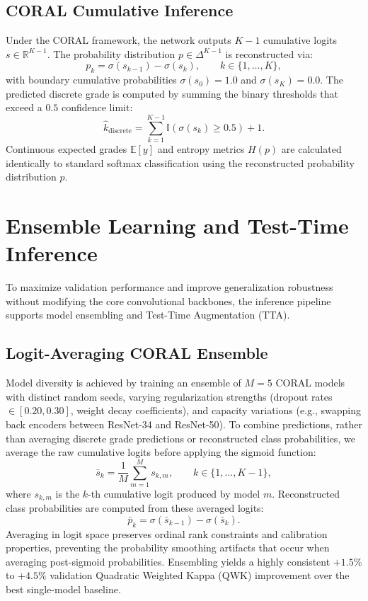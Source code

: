 \documentclass[12pt]{article}
\begin{document}
\subsection{CORAL Cumulative Inference}
Under the CORAL framework, the network outputs $K-1$ cumulative logits $s \in \mathbb{R}^{K-1}$.
The probability distribution $p \in \Delta^{K-1}$ is reconstructed via:
\[
p_k = \sigma(s_{k-1}) - \sigma(s_k), \qquad k \in \{1, \dots, K\},
\]
with boundary cumulative probabilities $\sigma(s_0) = 1.0$ and $\sigma(s_K) = 0.0$.
The predicted discrete grade is computed by summing the binary thresholds that exceed a $0.5$ confidence limit:
\[
\hat{k}_{\text{discrete}} = \sum_{k=1}^{K-1} \mathbb{I}(\sigma(s_k) \ge 0.5) + 1.
\]
Continuous expected grades $\mathbb{E}[y]$ and entropy metrics $H(p)$ are calculated identically to standard softmax classification using the reconstructed probability distribution $p$.

\section{Ensemble Learning and Test-Time Inference}
To maximize validation performance and improve generalization robustness without modifying the core convolutional backbones, the inference pipeline supports model ensembling and Test-Time Augmentation (TTA).

\subsection{Logit-Averaging CORAL Ensemble}
Model diversity is achieved by training an ensemble of $M = 5$ CORAL models with distinct random seeds, varying regularization strengths (dropout rates $\in [0.20, 0.30]$, weight decay coefficients), and capacity variations (e.g., swapping back encoders between ResNet-34 and ResNet-50).
To combine predictions, rather than averaging discrete grade predictions or reconstructed class probabilities, we average the raw cumulative logits before applying the sigmoid function:
\[
\bar{s}_k = \frac{1}{M}\sum_{m=1}^{M} s_{k,m}, \qquad k \in \{1, \dots, K-1\},
\]
where $s_{k,m}$ is the $k$-th cumulative logit produced by model $m$.
Reconstructed class probabilities are computed from these averaged logits:
\[
\bar{p}_k = \sigma(\bar{s}_{k-1}) - \sigma(\bar{s}_k).
\]
Averaging in logit space preserves ordinal rank constraints and calibration properties, preventing the probability smoothing artifacts that occur when averaging post-sigmoid probabilities. Ensembling yields a highly consistent $+1.5\%$ to $+4.5\%$ validation Quadratic Weighted Kappa (QWK) improvement over the best single-model baseline.
\end{document}
